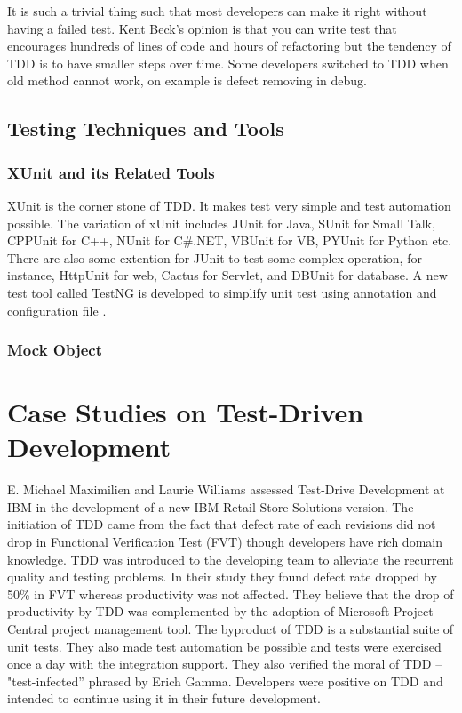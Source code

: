 It is such a trivial thing such that most developers can make it right
without having a failed test. Kent Beck's opinion is that you can write
test that encourages hundreds of lines of code and hours of refactoring but
the tendency of TDD is to have smaller steps over time. Some developers
switched to TDD when old method cannot work, on example is defect removing
in debug.

\subsection{Testing Techniques and Tools}
\subsubsection{XUnit and its Related Tools}
XUnit is the corner stone of TDD. It makes test very simple and test
automation possible. The variation of xUnit includes JUnit for
Java\cite{JUnit}, SUnit for Small Talk\cite{SUnit}, CPPUnit for
C++\cite{CPPUnit}, NUnit for C\#.NET\cite{NUnit}, VBUnit for
VB\cite{VBUnit}, PYUnit for Python\cite{PYUnit} etc.  There are also some
extention for JUnit to test some complex operation, for instance, HttpUnit
for web\cite{HttpUnit}, Cactus for Servlet\cite{Cactus}, and DBUnit for
database\cite{DBUnit}. A new test tool called TestNG is developed to
simplify unit test using annotation and configuration file \cite{TestNG}.

\subsubsection{Mock Object}

\section{Case Studies on Test-Driven Development}
E. Michael Maximilien and Laurie Williams assessed Test-Drive Development
at IBM in the development of a new IBM Retail Store Solutions
version.\cite{Maximilien:03} The initiation of TDD came from the fact that
defect rate of each revisions did not drop in Functional Verification Test
(FVT) though developers have rich domain knowledge. TDD was introduced to
the developing team to alleviate the recurrent quality and testing
problems.  In their study they found defect rate dropped by 50\% in FVT
whereas productivity was not affected.  They believe that the drop of
productivity by TDD was complemented by the adoption of Microsoft Project
Central project management tool. The byproduct of TDD is a substantial
suite of unit tests. They also made test automation be possible and tests
were exercised once a day with the integration support. They also verified
the moral of TDD -- "test-infected'' phrased by Erich Gamma\cite{Beck:03}.
Developers were positive on TDD and intended to continue using it in their
future development.

